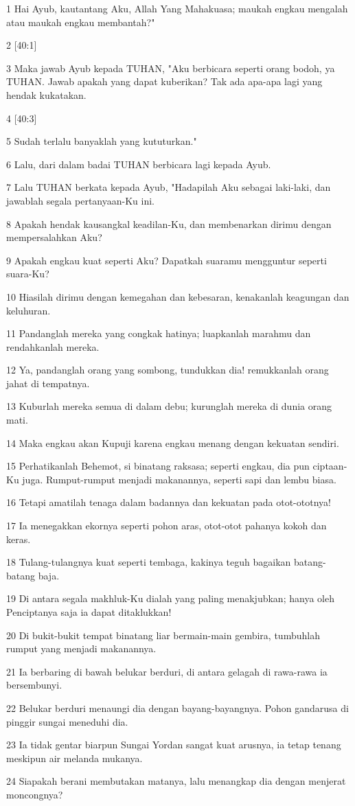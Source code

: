 \par 1 Hai Ayub, kautantang Aku, Allah Yang Mahakuasa; maukah engkau mengalah atau maukah engkau membantah?"
\par 2 [40:1]
\par 3 Maka jawab Ayub kepada TUHAN, "Aku berbicara seperti orang bodoh, ya TUHAN. Jawab apakah yang dapat kuberikan? Tak ada apa-apa lagi yang hendak kukatakan.
\par 4 [40:3]
\par 5 Sudah terlalu banyaklah yang kututurkan."
\par 6 Lalu, dari dalam badai TUHAN berbicara lagi kepada Ayub.
\par 7 Lalu TUHAN berkata kepada Ayub, "Hadapilah Aku sebagai laki-laki, dan jawablah segala pertanyaan-Ku ini.
\par 8 Apakah hendak kausangkal keadilan-Ku, dan membenarkan dirimu dengan mempersalahkan Aku?
\par 9 Apakah engkau kuat seperti Aku? Dapatkah suaramu mengguntur seperti suara-Ku?
\par 10 Hiasilah dirimu dengan kemegahan dan kebesaran, kenakanlah keagungan dan keluhuran.
\par 11 Pandanglah mereka yang congkak hatinya; luapkanlah marahmu dan rendahkanlah mereka.
\par 12 Ya, pandanglah orang yang sombong, tundukkan dia! remukkanlah orang jahat di tempatnya.
\par 13 Kuburlah mereka semua di dalam debu; kurunglah mereka di dunia orang mati.
\par 14 Maka engkau akan Kupuji karena engkau menang dengan kekuatan sendiri.
\par 15 Perhatikanlah Behemot, si binatang raksasa; seperti engkau, dia pun ciptaan-Ku juga. Rumput-rumput menjadi makanannya, seperti sapi dan lembu biasa.
\par 16 Tetapi amatilah tenaga dalam badannya dan kekuatan pada otot-ototnya!
\par 17 Ia menegakkan ekornya seperti pohon aras, otot-otot pahanya kokoh dan keras.
\par 18 Tulang-tulangnya kuat seperti tembaga, kakinya teguh bagaikan batang-batang baja.
\par 19 Di antara segala makhluk-Ku dialah yang paling menakjubkan; hanya oleh Penciptanya saja ia dapat ditaklukkan!
\par 20 Di bukit-bukit tempat binatang liar bermain-main gembira, tumbuhlah rumput yang menjadi makanannya.
\par 21 Ia berbaring di bawah belukar berduri, di antara gelagah di rawa-rawa ia bersembunyi.
\par 22 Belukar berduri menaungi dia dengan bayang-bayangnya. Pohon gandarusa di pinggir sungai meneduhi dia.
\par 23 Ia tidak gentar biarpun Sungai Yordan sangat kuat arusnya, ia tetap tenang meskipun air melanda mukanya.
\par 24 Siapakah berani membutakan matanya, lalu menangkap dia dengan menjerat moncongnya?

